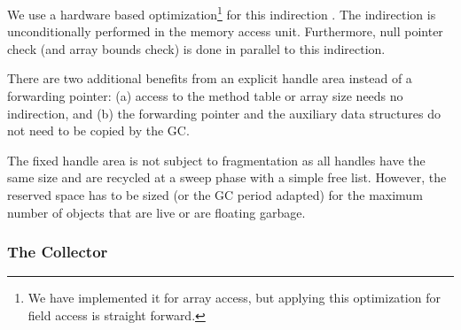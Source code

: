 We use a hardware based optimization\footnote{We have implemented it
for array access, but applying this optimization for field access is
straight forward.} for this indirection \cite{jop:oohw:jtres2007}.
The indirection is unconditionally performed in the memory access
unit. Furthermore, null pointer check (and array bounds check) is
done in parallel to this indirection.

There are two additional benefits from an explicit handle area instead of a
forwarding pointer: (a) access to the method table or array size needs no
indirection, and (b) the forwarding pointer and the auxiliary data
structures do not need to be copied by the GC.

The fixed handle area is not subject to fragmentation as all handles
have the same size and are recycled at a sweep phase with a simple
free list. However, the reserved space has to be sized (or the GC
period adapted) for the maximum number of objects that are live or
are floating garbage.


\subsubsection{The Collector}

